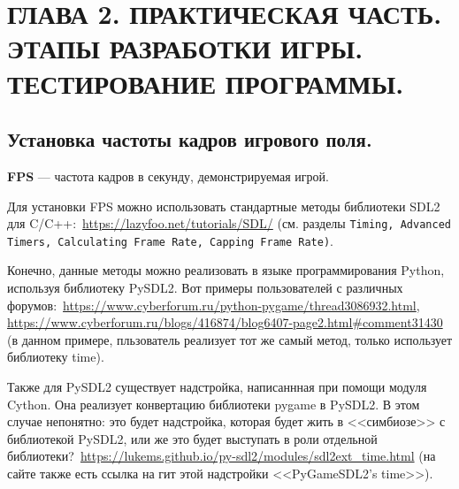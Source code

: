 \chapter{\label{ch:ch02}ГЛАВА 2. ПРАКТИЧЕСКАЯ ЧАСТЬ. ЭТАПЫ РАЗРАБОТКИ ИГРЫ. ТЕСТИРОВАНИЕ ПРОГРАММЫ.}

\section{\label{sec:ch02/sec01}Установка частоты кадров игрового поля.}
\textbf{FPS} --- частота кадров в секунду, демонстрируемая игрой.

Для установки FPS можно использовать стандартные методы библиотеки SDL2 для C/C++:~\url{https://lazyfoo.net/tutorials/SDL/} (см. разделы \texttt{Timing, Advanced Timers, Calculating Frame Rate, Capping Frame Rate)}.

Конечно, данные методы можно реализовать в языке программирования Python, используя библиотеку PySDL2. Вот примеры пользователей с различных форумов:~\url{https://www.cyberforum.ru/python-pygame/thread3086932.html}, \url{https://www.cyberforum.ru/blogs/416874/blog6407-page2.html#comment31430} (в данном примере, пльзователь реализует тот же самый метод, только использует библиотеку time).

Также для PySDL2 существует надстройка, написаннная при помощи модуля Cython. Она реализует конвертацию библиотеки pygame в PySDL2. В этом случае непонятно: это будет надстройка, которая будет жить в <<симбиозе>> с библиотекой PySDL2, или же это будет выступать в роли отдельной библиотеки?~\url{https://lukems.github.io/py-sdl2/modules/sdl2ext_time.html} (на сайте также есть ссылка на гит этой надстройки <<PyGameSDL2’s time>>).
